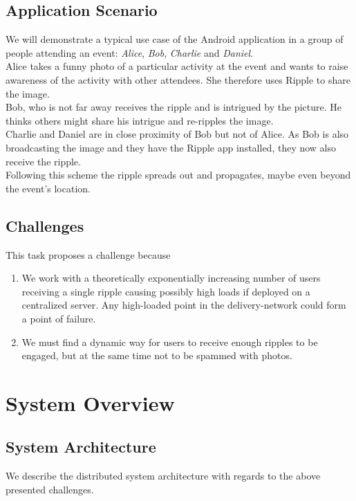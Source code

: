 \documentclass{report}
\begin{document}
\subsection{Application Scenario}
We will demonstrate a typical use case of the Android application in a group of people attending an event: \textit{Alice}, \textit{Bob}, \textit{Charlie} and \textit{Daniel}.\\
Alice takes a funny photo of a particular activity at the event and wants to raise awareness of the activity with other attendees. She therefore uses Ripple to share the image.\\
Bob, who is not far away receives the ripple and is intrigued by the picture. He thinks others might share his intrigue and re-ripples the image.\\
Charlie and Daniel are in close proximity of Bob but not of Alice. As Bob is also broadcasting the image and they have the Ripple app installed, they now also receive the ripple.\\
Following this scheme the ripple spreads out and propagates, maybe even beyond the event's location.

\subsection{Challenges}
This task proposes a challenge because 

\begin{enumerate}
\item We work with a theoretically exponentially increasing number of users receiving a single ripple causing possibly high loads if deployed on a centralized server.
Any high-loaded point in the delivery-network could form a point of failure.
\item We must find a dynamic way for users to receive enough ripples to be engaged, but at the same time not to be spammed with photos.
\end{enumerate}

\section{System Overview}


\subsection{System Architecture}
We describe the distributed system architecture with regards to the above presented challenges. \\
\end{document}

